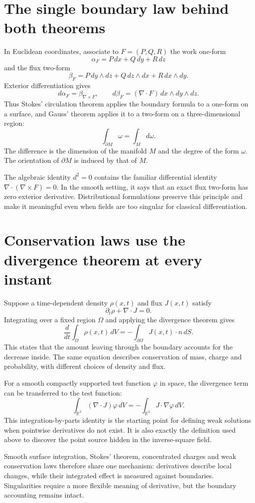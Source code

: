 \section{The single boundary law behind both theorems}

In Euclidean coordinates, associate to \(F=(P,Q,R)\) the work one-form
\[
 \alpha_F=P\,dx+Q\,dy+R\,dz
\]
and the flux two-form
\[
 \beta_F=P\,dy\wedge dz+Q\,dz\wedge dx+R\,dx\wedge dy.
\]
Exterior differentiation gives
\[
 d\alpha_F=\beta_{\nabla\times F},\qquad
 d\beta_F=(\nabla\cdot F)\,dx\wedge dy\wedge dz.
\]
Thus Stokes' circulation theorem applies the boundary formula to a one-form on a surface, and Gauss' theorem applies it to a two-form on a three-dimensional region:
\[
 \boxed{\int_{\partial M}\omega=\int_Md\omega.}
\]
The difference is the dimension of the manifold \(M\) and the degree of the form \(\omega\). The orientation of \(\partial M\) is induced by that of \(M\).

The algebraic identity \(d^2=0\) contains the familiar differential identity \(\nabla\cdot(\nabla\times F)=0\). In the smooth setting, it says that an exact flux two-form has zero exterior derivative. Distributional formulations preserve this principle and make it meaningful even when fields are too singular for classical differentiation.

\section{Conservation laws use the divergence theorem at every instant}

Suppose a time-dependent density \(\rho(x,t)\) and flux \(J(x,t)\) satisfy
\[
 \partial_t\rho+\nabla\cdot J=0.
\]
Integrating over a fixed region \(\Omega\) and applying the divergence theorem gives
\[
 \boxed{\frac d{dt}\int_\Omega\rho(x,t)\,dV
 =-\int_{\partial\Omega}J(x,t)\cdot n\,dS.}
\]
This states that the amount leaving through the boundary accounts for the decrease inside. The same equation describes conservation of mass, charge and probability, with different choices of density and flux.

For a smooth compactly supported test function \(\varphi\) in space, the divergence term can be transferred to the test function:
\[
 \int_{\mathbb R^3}(\nabla\cdot J)\varphi\,dV
 =-\int_{\mathbb R^3}J\cdot\nabla\varphi\,dV.
\]
This integration-by-parts identity is the starting point for defining weak solutions when pointwise derivatives do not exist. It is also exactly the definition used above to discover the point source hidden in the inverse-square field.

Smooth surface integration, Stokes' theorem, concentrated charges and weak conservation laws therefore share one mechanism: derivatives describe local changes, while their integrated effect is measured against boundaries. Singularities require a more flexible meaning of derivative, but the boundary accounting remains intact.

